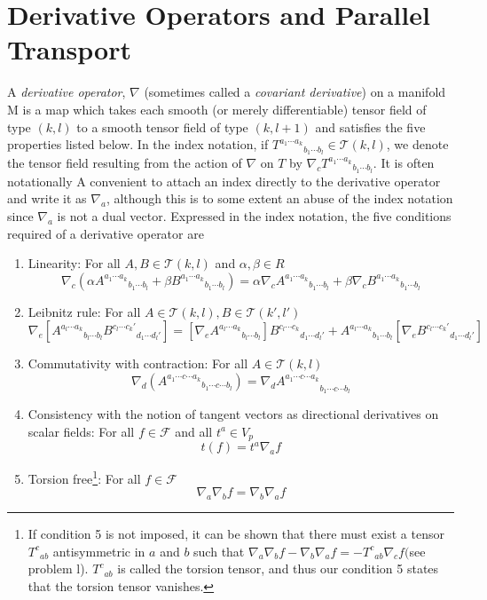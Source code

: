 \label{3.2.3}\label{3.2.25}

\section{Derivative Operators and Parallel Transport}
A \emph{derivative operator}, $\nabla$ (sometimes called a \emph{covariant derivative}) on a manifold M is a map which takes each smooth (or merely differentiable) tensor field of type $(k,l)$ to a smooth tensor field of type $(k,l+1)$ and satisfies the five properties listed below. In the index notation, if ${T^{a_1\cdots a_k}}_{b_1\cdots b_l}\in\mathscr{T}(k,l)$, we denote the tensor field resulting from the action of $\nabla$ on $T$ by $\nabla_c{T^{a_1\cdots a_k}}_{b_1\cdots b_l}.$ It is often notationally A
convenient to attach an index directly to the derivative operator and write it as $\nabla_a$, although this is to some extent an abuse of the index notation since $\nabla_a$ is not a dual vector. Expressed in the index notation, the five conditions required of a derivative operator are

\begin{enumerate}
    \item Linearity: For all $A, B\in \mathscr{T} (k,l) $ and $\alpha, \beta\in R$
    \[\nabla_c(\alpha{A^{a_1\cdots a_k}}_{b_1\cdots b_l}+\beta {B^{a_1\cdots a_k}}_{b_1\cdots b_l})=\alpha\nabla_c{A^{a_1\cdots a_k}}_{b_1\cdots b_l}+\beta\nabla_c{B^{a_1\cdots a_k}}_{b_1\cdots b_l}\]
    \item Leibnitz rule: For all $A\in\mathscr{T}(k,l),B\in\mathscr{T}(k',l')$
    \[\nabla_e[{A^{a_l\cdots a_k}}_{b_l\cdots b_l}{B^{c_l\cdots c_k'}}_{d_1\cdots d_l'}]=[\nabla_e{A^{a_l\cdots a_k}}_{b_l\cdots b_l}]{B^{c_l\cdots c_k}}_{d_1\cdots d_l'}+{A^{a_l\cdots a_k}}_{b_1\cdots b_l}[\nabla_e{B^{c_l\cdots c_k'}}_{d_1\cdots d_l'}]\]
    \item Commutativity with contraction: For all $A\in\mathscr{T}(k,l)$
    \[\nabla_{d}({A^{a_1\cdots c\cdots a_k}}_{b_1\cdots c\cdots b_l})={\nabla_{d}A^{a_1\cdots c\cdots a_k}}_{b_1\cdots c\cdots b_l}\]
    \item Consistency with the notion of tangent vectors as directional derivatives on scalar fields: For all $f\in\mathscr{F}$ and all $t^a\in V_p$
    \[t(f)=t^a\nabla_af\]
    \item Torsion free\footnote{If condition 5 is not imposed, it can be shown that there must exist a tensor ${T^c}_{ab}$ antisymmetric in $a$ and $b$ such that $\nabla_a\nabla_bf-\nabla_b\nabla_af=-{T^c}_{ab}\nabla_cf($see problem l). ${T^c}_{ab}$ is called the torsion tensor, and thus our condition 5 states that the torsion tensor vanishes.}: For all $f\in\mathscr{F}$ 
    \[
    \nabla_a\nabla_bf=\nabla_b\nabla_af
    \]
\end{enumerate}

